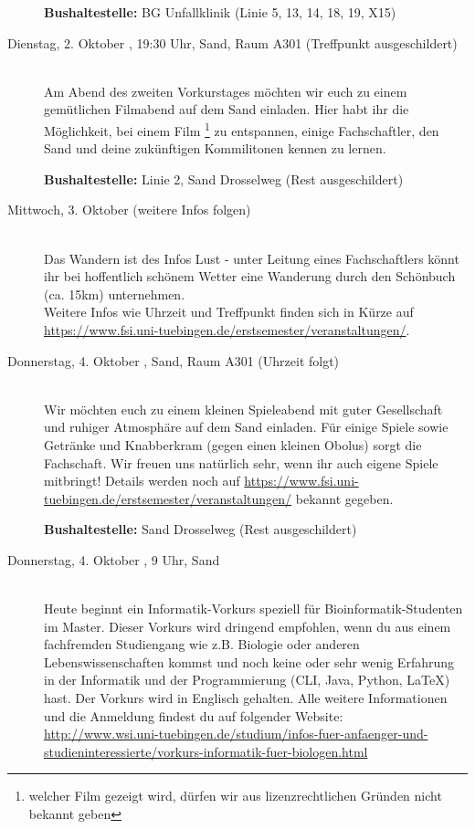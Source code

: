 \begin{description}
\textbf{Bushaltestelle:} BG Unfallklinik (Linie 5, 13, 14, 18, 19, X15)

\item[Dienstag, 2. Oktober \Jahr, 19:30 Uhr, Sand, Raum A301 (Treffpunkt ausgeschildert)] \\
Am Abend des zweiten Vorkurstages möchten wir euch zu einem gemütlichen Filmabend auf dem Sand einladen.
Hier habt ihr die Möglichkeit, bei einem Film \footnote{welcher Film gezeigt wird, dürfen wir aus lizenzrechtlichen Gründen nicht bekannt geben} zu entspannen, einige Fachschaftler, den Sand und deine zukünftigen Kommilitonen kennen zu lernen.

\textbf{Bushaltestelle:} Linie 2, Sand Drosselweg (Rest ausgeschildert) 

\item[Mittwoch, 3. Oktober \Jahr (weitere Infos folgen)] \\
Das Wandern ist des Infos Lust - unter Leitung eines Fachschaftlers könnt ihr bei hoffentlich schönem Wetter eine Wanderung durch den Schönbuch (ca. 15km) unternehmen. \\
Weitere Infos wie Uhrzeit und Treffpunkt finden sich in Kürze auf \url{https://www.fsi.uni-tuebingen.de/erstsemester/veranstaltungen/}.

\item[Donnerstag, 4. Oktober \Jahr, Sand, Raum A301 (Uhrzeit folgt)]\ \\
Wir möchten euch zu einem kleinen Spieleabend mit guter Gesellschaft und ruhiger Atmosphäre auf dem Sand einladen. Für einige Spiele sowie Getränke und Knabberkram (gegen einen kleinen Obolus) sorgt die Fachschaft. Wir freuen uns natürlich sehr, wenn ihr auch eigene Spiele mitbringt! Details werden noch auf \url{https://www.fsi.uni-tuebingen.de/erstsemester/veranstaltungen/} bekannt gegeben.

\textbf{Bushaltestelle:} Sand Drosselweg (Rest ausgeschildert) 

\ifmaster
\ifbinfo
\item[Donnerstag, 4. Oktober \Jahr, 9 Uhr, Sand]\ \\
 Heute beginnt ein Informatik-Vorkurs speziell für Bioinformatik-Studenten im Master. Dieser Vorkurs wird dringend empfohlen, wenn du aus einem fachfremden Studiengang wie z.B. Biologie oder anderen Lebenswissenschaften kommst und noch keine oder sehr wenig Erfahrung in der Informatik und der Programmierung (CLI, Java, Python, \LaTeX) hast. Der Vorkurs wird in Englisch gehalten. Alle weitere Informationen und die Anmeldung findest du auf folgender Website: \\ \url{http://www.wsi.uni-tuebingen.de/studium/infos-fuer-anfaenger-und-studieninteressierte/vorkurs-informatik-fuer-biologen.html}


\end{description}
